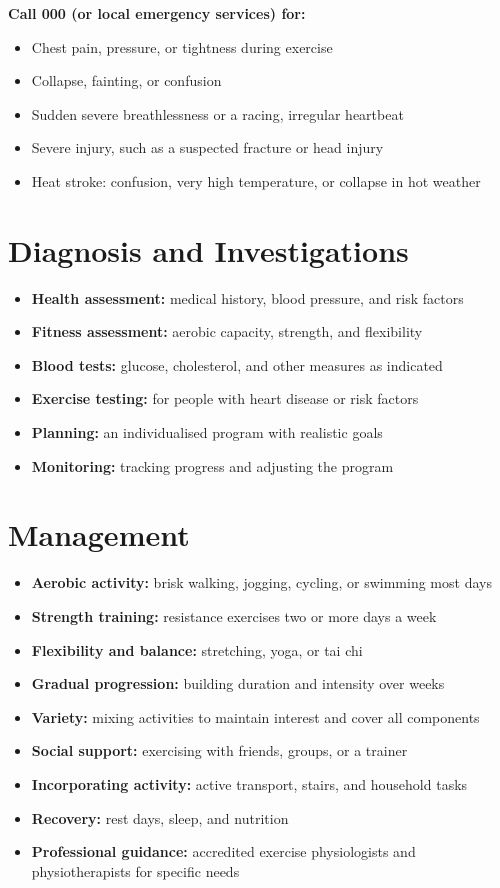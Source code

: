 \textbf{Call 000 (or local emergency services) for:}
\begin{itemize}
    \item Chest pain, pressure, or tightness during exercise
    \item Collapse, fainting, or confusion
    \item Sudden severe breathlessness or a racing, irregular heartbeat
    \item Severe injury, such as a suspected fracture or head injury
    \item Heat stroke: confusion, very high temperature, or collapse in hot weather
\end{itemize}

\section*{Diagnosis and Investigations}
\begin{itemize}
    \item \textbf{Health assessment:} medical history, blood pressure, and risk factors
    \item \textbf{Fitness assessment:} aerobic capacity, strength, and flexibility
    \item \textbf{Blood tests:} glucose, cholesterol, and other measures as indicated
    \item \textbf{Exercise testing:} for people with heart disease or risk factors
    \item \textbf{Planning:} an individualised program with realistic goals
    \item \textbf{Monitoring:} tracking progress and adjusting the program
\end{itemize}

\section*{Management}
\begin{itemize}
    \item \textbf{Aerobic activity:} brisk walking, jogging, cycling, or swimming most days
    \item \textbf{Strength training:} resistance exercises two or more days a week
    \item \textbf{Flexibility and balance:} stretching, yoga, or tai chi
    \item \textbf{Gradual progression:} building duration and intensity over weeks
    \item \textbf{Variety:} mixing activities to maintain interest and cover all components
    \item \textbf{Social support:} exercising with friends, groups, or a trainer
    \item \textbf{Incorporating activity:} active transport, stairs, and household tasks
    \item \textbf{Recovery:} rest days, sleep, and nutrition
    \item \textbf{Professional guidance:} accredited exercise physiologists and physiotherapists for specific needs
\end{itemize}

